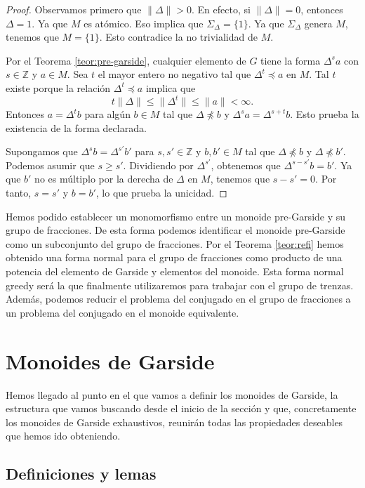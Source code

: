 \documentclass[12pt]{book}
\theoremstyle{definition}
\providecommand{\norm}[1]{\lVert#1\rVert}
\begin{document}
\begin{proof} Observamos primero que $\norm{\Delta}>0$. En efecto, si $\norm{\Delta}= 0$, entonces $\Delta=1$. Ya que $M$ es atómico. Eso implica que $\Sigma_\Delta=\{1\}$. Ya que $\Sigma_\Delta$ genera $M$, tenemos que $M=\{1\}$. Esto contradice la no trivialidad de $M$.

Por el Teorema \ref{teor:pre-garside}, cualquier elemento de $G$ tiene la forma $\Delta^sa$ con $s\in\mathbb{Z}$ y $a\in M$. Sea $t$ el mayor entero no negativo tal que $\Delta^t\preceq a$ en $M$. Tal $t$ existe porque la relación $\Delta^t\preceq a$ implica que
$$t\norm{\Delta}\leq \norm{\Delta^t}\leq \norm{a}<\infty.$$
Entonces $a=\Delta^t b$ para algún $b\in M$ tal que $\Delta\npreceq b$ y $\Delta^s a=\Delta^{s+t} b$. Esto prueba la existencia de la forma declarada.

Supongamos que $\Delta^s b=\Delta^{s'}b'$ para $s,s'\in\mathbb{Z}$ y $b,b'\in M$ tal que $\Delta\npreceq b$ y $\Delta\npreceq b'$. Podemos asumir que $s\geq s'$. Dividiendo por $\Delta^{s'}$, obtenemos que $\Delta^{s-s'}b=b'$. Ya que $b'$ no es múltiplo por la derecha de $\Delta$ en $M$, tenemos que $s-s'=0$. Por tanto, $s=s'$ y $b=b'$, lo que prueba la unicidad.
\end{proof}

Hemos podido establecer un monomorfismo entre un monoide pre-Garside y su grupo de fracciones. De esta forma podemos identificar el monoide pre-Garside como un subconjunto del grupo de fracciones. Por el Teorema \ref{teor:refi} hemos obtenido una forma normal para el grupo de fracciones como producto de una potencia del elemento de Garside y elementos del monoide. Esta forma normal greedy será la que finalmente utilizaremos para trabajar con el grupo de trenzas. Además, podemos reducir el problema del conjugado en el grupo de fracciones a un problema del conjugado en el monoide equivalente.

\section{Monoides de Garside}

Hemos llegado al punto en el que vamos a definir los monoides de Garside, la estructura que vamos buscando desde el inicio de la sección y que, concretamente los monoides de Garside exhaustivos, reunirán todas las propiedades deseables que hemos ido obteniendo.
\subsection{Definiciones y lemas}
\end{document}
